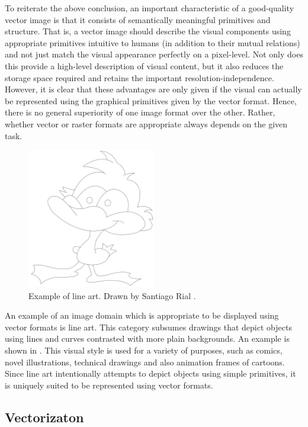 To reiterate the above conclusion, an important characteristic of a good-quality vector image is that it consists of semantically meaningful primitives and structure. That is, a vector image should describe the visual components using appropriate primitives intuitive to humans (in addition to their mutual relations) and not just match the visual appearance perfectly on a pixel-level. Not only does this provide a high-level description of visual content, but it also reduces the storage space required and retains the important resolution-independence. However, it is clear that these advantages are only given if the visual can actually be represented using the graphical primitives given by the vector format. Hence, there is no general superiority of one image format over the other. Rather, whether vector or raster formats are appropriate always depends on the given task.

\begin{figure}
    \centering
    \includegraphics[width=0.5\textwidth]{graphics/Art_freeform_baseline_09_Santiago Rial_norm_cleaned.pdf}
    \caption{Example of line art. Drawn by Santiago Rial \citep{Yan:2020:ABR}.}
    \label{fig:line-art-ex}
\end{figure}

An example of an image domain which is appropriate to be displayed using vector formats is line art. This category subsumes drawings that depict objects using lines and curves contrasted with more plain backgrounds. An example is shown in . This visual style is used for a variety of purposes, such as comics, novel illustrations, technical drawings and also animation frames of cartoons. Since line art intentionally attempts to depict objects using simple primitives, it is uniquely suited to be represented using vector formats.


\subsection{Vectorizaton}
\label{sec:vec}

